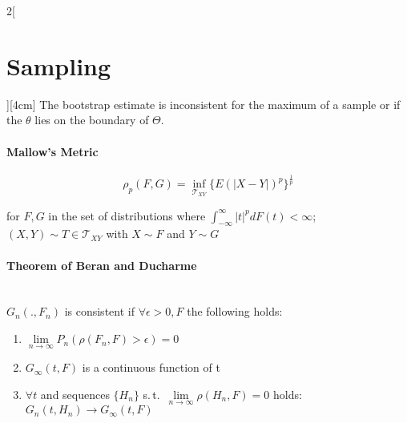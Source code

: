 \documentclass[8pt]{extarticle}
\begin{document}
\begin{multicols}{2}[\section{Sampling}][4cm]
\vspace{0.5em}
\noindent The bootstrap estimate is inconsistent for the maximum of a sample or if the $\theta$ lies on the boundary of $\Theta$.

\paragraph{Mallow's Metric}

$$\rho_p(F,G) = \underset{\mathcal{T}_{XY}}{\inf}\{E(|X-Y|)^p\}^\frac{1}{p} $$

\noindent for $F,G$ in the set of distributions where $\int_{-\infty}^\infty |t|^pdF(t) <\infty$; $(X,Y) \sim T \in\mathcal{T}_{XY}$ with $X\sim F$ and $Y\sim G$

\paragraph{Theorem of Beran and Ducharme} \ \\

$G_n (., F_n)$ is consistent if $\forall \epsilon > 0, F$ the following holds:

\begin{enumerate}
\item $\underset{n\rightarrow\infty}{\lim}P_n(\rho(F_n,F)>\epsilon)=0$
\item $G_\infty(t,F)$ is a continuous function of t
\item $\forall t$ and sequences $\{H_n\}$ s.\,t.\ $\underset{n\rightarrow\infty}{\lim}\rho(H_n,F)=0$ holds: $G_n(t,H_n) \rightarrow G_\infty(t,F)$
\end{enumerate}


\end{multicols}
\end{document}
